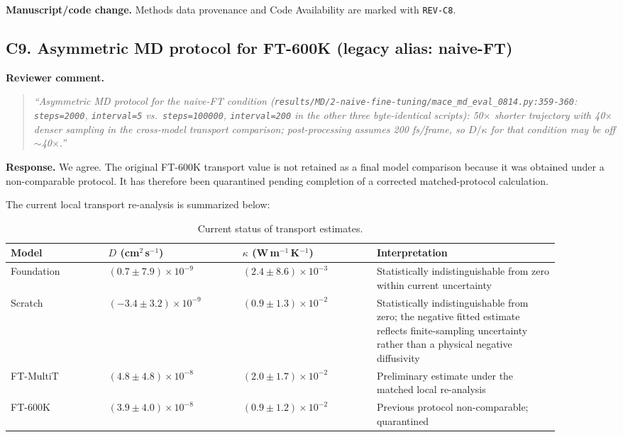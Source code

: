 \documentclass[11pt,a4paper]{article}
\begin{document}
\noindent\textbf{Manuscript/code change.}
Methods data provenance and Code Availability are marked with \texttt{REV-C8}.

\subsection*{C9. Asymmetric MD protocol for FT-600K (legacy alias: naive-FT)}

\noindent\textbf{Reviewer comment.}
\begin{quote}
\itshape
``Asymmetric MD protocol for the naive-FT condition (\texttt{results/MD/2-naive-fine-tuning/mace\_md\_eval\_0814.py:359-360}: \texttt{steps=2000}, \texttt{interval=5} vs.\ \texttt{steps=100000}, \texttt{interval=200} in the other three byte-identical scripts): 50$\times$ shorter trajectory with 40$\times$ denser sampling in the cross-model transport comparison; post-processing assumes 200 fs/frame, so $D/\kappa$ for that condition may be off $\sim$40$\times$.''
\end{quote}

\noindent\textbf{Response.}
We agree. The original FT-600K transport value is not retained as a final model comparison because it was obtained under a non-comparable protocol. It has therefore been quarantined pending completion of a corrected matched-protocol calculation.

The current local transport re-analysis is summarized below:

\begin{table}[h]
\centering
\caption{Current status of transport estimates.}
\begin{tabular}{p{0.16\linewidth}p{0.22\linewidth}p{0.22\linewidth}p{0.30\linewidth}}
\toprule
Model & $D$ (cm$^2$\,s$^{-1}$) & $\kappa$ (W\,m$^{-1}$\,K$^{-1}$) & Interpretation \\
\midrule
Foundation &
$(0.7 \pm 7.9)\times10^{-9}$ &
$(2.4 \pm 8.6)\times10^{-3}$ &
Statistically indistinguishable from zero within current uncertainty \\
Scratch &
$(-3.4 \pm 3.2)\times10^{-9}$ &
$(0.9 \pm 1.3)\times10^{-2}$ &
Statistically indistinguishable from zero; the negative fitted estimate reflects finite-sampling uncertainty rather than a physical negative diffusivity \\
FT-MultiT &
$(4.8 \pm 4.8)\times10^{-8}$ &
$(2.0 \pm 1.7)\times10^{-2}$ &
Preliminary estimate under the matched local re-analysis \\
FT-600K &
$(3.9 \pm 4.0)\times10^{-8}$ &
$(0.9 \pm 1.2)\times10^{-2}$ &
Previous protocol non-comparable; quarantined \\
\bottomrule
\end{tabular}
\end{table}
\end{document}

